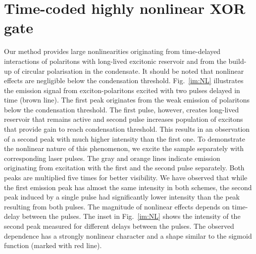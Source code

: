 \documentclass[
 print,
 amsmath,amssymb,
 aps,
]{revtex4-2}
\begin{document}
	\section{\label{sec:experiment}Time-coded highly nonlinear XOR gate}

	Our method provides large nonlinearities originating from time-delayed interactions of polaritons with long-lived excitonic reservoir and from the build-up of circular polarisation in the condensate. It should be noted that nonlinear effects are negligible below the condensation threshold. Fig.~\ref{im:NL} illustrates the emission signal from exciton-polaritons excited with two pulses delayed in time (brown line). The first peak originates from the weak emission of polaritons below the condensation threshold. The first pulse, however, creates long-lived reservoir that remains active and second pulse increases population of excitons that provide gain to reach condensation threshold. This results in an observation of a second peak with much higher intensity than the first one. To demonstrate the nonlinear nature of this phenomenon, we excite the sample separately with corresponding laser pulses. The gray and orange lines indicate emission originating from excitation with the first and the second pulse separately. Both peaks are multiplied five times for better visibility. We have observed that while the first emission peak has almost the same intensity in both schemes, the second peak induced by a single pulse had significantly lower intensity than the peak resulting from both pulses. The magnitude of nonlinear effects depends on time-delay between the pulses. The inset in Fig.~\ref{im:NL} shows the intensity of the second peak measured for different delays between the pulses. The observed dependence has a strongly nonlinear character and a shape similar to the sigmoid function (marked with red line).
	
\end{document}
